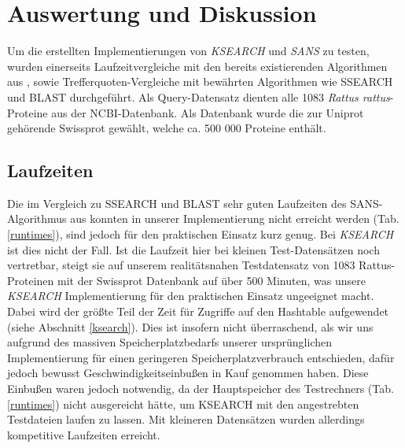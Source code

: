 \documentclass{article}
\begin{document}



\section{Auswertung und Diskussion}

Um die erstellten Implementierungen von \emph{KSEARCH} und \emph{SANS} zu testen, wurden einerseits Laufzeitvergleiche mit den bereits existierenden Algorithmen aus \cite{Holm}, sowie Trefferquoten-Vergleiche mit bewährten Algorithmen wie SSEARCH und BLAST durchgeführt. Als Query-Datensatz dienten alle 1083 \textit{Rattus rattus}-Proteine aus der NCBI-Datenbank. Als Datenbank wurde die zur Uniprot gehörende Swissprot gewählt, welche ca. 500 000 Proteine enthält.

\subsection{Laufzeiten}

Die im Vergleich zu SSEARCH und BLAST sehr guten Laufzeiten des SANS-Algorithmus aus \cite{Holm}
konnten in unserer Implementierung nicht erreicht werden (Tab. \ref{runtimes}), sind jedoch für den praktischen Einsatz kurz genug.
Bei \emph{KSEARCH} ist dies nicht der Fall. Ist die Laufzeit hier bei kleinen Test-Datensätzen noch vertretbar, steigt sie auf unserem realitätsnahen
Testdatensatz von 1083 Rattus-Proteinen mit der Swissprot Datenbank auf über 500 Minuten, was unsere \emph{KSEARCH} Implementierung für den praktischen Einsatz ungeeignet macht. Dabei wird der größte Teil der Zeit für Zugriffe auf den Hashtable aufgewendet (siehe Abschnitt \ref{ksearch}). Dies ist insofern nicht
überraschend, als wir uns aufgrund des massiven Speicherplatzbedarfs unserer ursprünglichen Implementierung für einen geringeren
Speicherplatzverbrauch entschieden, dafür jedoch bewusst Geschwindigkeitseinbußen in Kauf genommen haben. 
Diese Einbußen waren jedoch notwendig, da der Hauptspeicher des Testrechners (Tab. \ref{runtimes}) nicht ausgereicht hätte, um KSEARCH mit den angestrebten Testdateien laufen zu lassen. 
Mit kleineren Datensätzen wurden allerdings kompetitive Laufzeiten erreicht.
 
\end{document}
